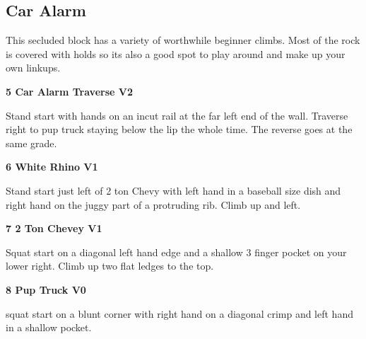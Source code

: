 \begin{multicols*}{2}
			\subsection*{Car Alarm}\label{bf:Car Alarm}
			\begin{minipage}{\columnwidth}
			This secluded block has a variety of worthwhile beginner climbs. Most of the rock is covered with holds so its also a good spot to play around and make up your own linkups.
			\end{minipage}
			

					\label{rt:Car Alarm Traverse}\colorbox{green!20}{\textbf{5 Car Alarm Traverse V2 \ding{72}   }}
					\begin{adjustwidth}{0.5cm}{}
					\begin{minipage}{\linewidth}					
					Stand start with hands on an incut rail at the far left end of the wall. Traverse right to pup truck staying below the lip the whole time. The reverse goes at the same grade.
					\end{minipage}
					\end{adjustwidth}
					\label{rt:White Rhino}\colorbox{green!20}{\textbf{6 White Rhino V1   }}
					\begin{adjustwidth}{0.5cm}{}
					\begin{minipage}{\linewidth}					
					Stand start just left of 2 ton Chevy with left hand in a baseball size dish and right hand on the juggy part of a protruding rib. Climb up and left.
					\end{minipage}
					\end{adjustwidth}
					\label{rt:2 Ton Chevey}\colorbox{green!20}{\textbf{7 2 Ton Chevey V1    }}
					\begin{adjustwidth}{0.5cm}{}
					\begin{minipage}{\linewidth}					
					Squat start on a diagonal left hand edge and a shallow 3 finger pocket on your lower right. Climb up two flat ledges to the top.
					\end{minipage}
					\end{adjustwidth}
					\label{rt:Pup Truck}\colorbox{green!20}{\textbf{8 Pup Truck V0    }}
					\begin{adjustwidth}{0.5cm}{}
					\begin{minipage}{\linewidth}					
					squat start on a blunt corner with right hand on a diagonal crimp and left hand in a shallow pocket.
					\end{minipage}
					\end{adjustwidth}


\end{multicols*}

